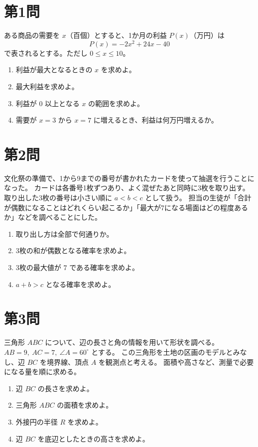 \documentclass[a4paper,12pt]{jsarticle}
\begin{document}
\section*{第1問}
ある商品の需要を $x$（百個）とすると、1か月の利益 $P(x)$（万円）は
\[
P(x)=-2x^2+24x-40
\]
で表されるとする。ただし $0\le x\le 10$。

\begin{enumerate}[label=\arabic*.]
  \item 利益が最大となるときの $x$ を求めよ。
  \item 最大利益を求めよ。
  \item 利益が 0 以上となる $x$ の範囲を求めよ。
  \item 需要が $x=3$ から $x=7$ に増えるとき、利益は何万円増えるか。
\end{enumerate}

\section*{第2問}
文化祭の準備で、1から9までの番号が書かれたカードを使って抽選を行うことになった。  
カードは各番号1枚ずつあり、よく混ぜたあと同時に3枚を取り出す。取り出した3枚の番号は小さい順に $a<b<c$ として扱う。  
担当の生徒が「合計が偶数になることはどれくらい起こるか」「最大が7になる場面はどの程度あるか」などを調べることにした。

\begin{enumerate}[label=\arabic*.]
  \item 取り出し方は全部で何通りか。
  \item 3枚の和が偶数となる確率を求めよ。
  \item 3枚の最大値が $7$ である確率を求めよ。
  \item $a+b>c$ となる確率を求めよ。
\end{enumerate}

\section*{第3問}
三角形 $ABC$ について、辺の長さと角の情報を用いて形状を調べる。  
$AB=9,\ AC=7,\ \angle A=60^\circ$ とする。  
この三角形を土地の区画のモデルとみなし、辺 $BC$ を境界線、頂点 $A$ を観測点と考える。  
面積や高さなど、測量で必要になる量を順に求める。

\begin{enumerate}[label=\arabic*.]
  \item 辺 $BC$ の長さを求めよ。
  \item 三角形 $ABC$ の面積を求めよ。
  \item 外接円の半径 $R$ を求めよ。
  \item 辺 $BC$ を底辺としたときの高さを求めよ。
\end{enumerate}
\end{document}
